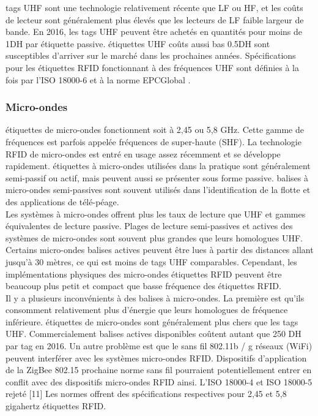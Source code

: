 \documentclass[11pt, a4paper, twoside]{book}
\begin{document}
tags UHF sont une technologie relativement récente que LF ou HF, et les coûts de lecteur sont généralement plus élevés que les lecteurs de LF faible largeur de bande. En 2016, les tags UHF peuvent être achetés en quantités pour moins de 1DH par étiquette passive. étiquettes UHF coûts aussi bas  0.5DH sont susceptibles d'arriver sur le marché dans les prochaines années. Spécifications pour les étiquettes RFID fonctionnant à des fréquences UHF sont définies à la fois par l'ISO 18000-6 et à la norme EPCGlobal .
\subsubsection{Micro-ondes} 
étiquettes de micro-ondes fonctionnent soit à 2,45 ou 5,8 GHz. Cette gamme de fréquences est parfois appelée fréquences de super-haute (SHF). La technologie RFID de micro-ondes est entré en usage assez récemment et se développe rapidement. étiquettes à micro-ondes utilisées dans la pratique sont généralement semi-passif ou actif, mais peuvent aussi se présenter sous forme passive. balises à micro-ondes semi-passives sont souvent utilisés dans l'identification de la flotte et des applications de télé-péage.\\


Les systèmes à micro-ondes offrent plus les taux de lecture que UHF et gammes équivalentes de lecture passive. Plages de lecture semi-passives et actives des systèmes de micro-ondes sont souvent plus grandes que leurs homologues UHF. Certains micro-ondes balises actives peuvent être lues à partir des distances allant jusqu'à 30 mètres, ce qui est moins de tags UHF comparables. Cependant, les implémentations physiques des micro-ondes étiquettes RFID peuvent être beaucoup plus petit et compact que basse fréquence des étiquettes RFID.\\


Il y a plusieurs inconvénients à des balises à micro-ondes. La première est qu'ils consomment relativement plus d'énergie que leurs homologues de fréquence inférieure. étiquettes de micro-ondes sont généralement plus chers que les tags UHF. Commercialement balises actives disponibles coûtent autant que 250 DH par tag en 2016.
Un autre problème est que le sans fil 802.11b / g réseaux (WiFi) peuvent interférer avec les systèmes micro-ondes RFID. Dispositifs d'application de la ZigBee 802.15 prochaine norme sans fil pourraient potentiellement entrer en conflit avec des dispositifs micro-ondes RFID ainsi.
L'ISO 18000-4 et ISO 18000-5 rejeté [11] Les normes offrent des spécifications respectives pour 2,45 et 5,8 gigahertz étiquettes RFID.
\end{document}

